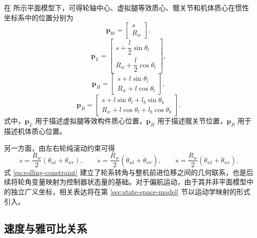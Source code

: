 在 所示平面模型下，可得轮轴中心、虚拟腿等效质心、髋关节和机体质心在惯性坐标系中的位置分别为
\begin{equation}
  \boldsymbol{p}_W =
  \begin{bmatrix}
    s \\
    R_w
  \end{bmatrix},
  \label{eq:w-pos}
\end{equation}
\begin{equation}
  \boldsymbol{p}_L =
  \begin{bmatrix}
    s + \dfrac{l}{2}\sin\theta_l \\
    R_w + \dfrac{l}{2}\cos\theta_l
  \end{bmatrix},
  \label{eq:l-pos}
\end{equation}
\begin{equation}
  \boldsymbol{p}_H =
  \begin{bmatrix}
    s + l\sin\theta_l \\
    R_w + l\cos\theta_l
  \end{bmatrix},
  \label{eq:h-pos}
\end{equation}
\begin{equation}
  \boldsymbol{p}_B =
  \begin{bmatrix}
    s + l\sin\theta_l + l_b\sin\theta_b \\
    R_w + l\cos\theta_l + l_b\cos\theta_b
  \end{bmatrix}.
  \label{eq:b-pos}
\end{equation}
式中，$\boldsymbol{p}_L$ 用于描述虚拟腿等效构件质心位置，$\boldsymbol{p}_H$ 用于描述髋关节位置，$\boldsymbol{p}_B$ 用于描述机体质心位置。

另一方面，由左右轮纯滚动约束可得
\begin{equation}
  s = \frac{R_w}{2}\left(\theta_{wl} + \theta_{wr}\right),\qquad
  \dot{s} = \frac{R_w}{2}\left(\dot{\theta}_{wl} + \dot{\theta}_{wr}\right),\qquad
  \ddot{s} = \frac{R_w}{2}\left(\ddot{\theta}_{wl} + \ddot{\theta}_{wr}\right).
  \label{eq:rolling-constraint}
\end{equation}
式 \eqref{eq:rolling-constraint} 建立了轮系转角与整机前进位移之间的几何联系，也是后续将轮角变量映射为控制器状态量的基础。对于偏航运动，由于其并非平面模型中的独立广义坐标，相关表达将在第 \ref{sec:state-space-model} 节以运动学映射的形式引入。

\subsection{速度与雅可比关系}

